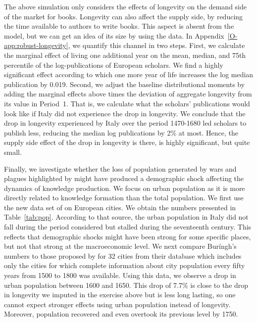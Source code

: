 The above simulation only considers the effects of longevity on the demand side of the market for books. Longevity can also affect the supply side, by reducing the time available to authors to write books. This aspect is absent from the model, but we can get an idea of its size by using the data. In Appendix~\ref{O-app:robust-longevity}, we quantify this channel  in two steps. First, we calculate the marginal effect of living one additional year on the mean, median, and 75th percentile of the log-publications of European scholars. We find a highly significant effect according to which one more year of life increases the log median publication by 0.019.
Second, we adjust the baseline distributional moments by adding the marginal effects above times the deviation of aggregate longevity from its value in Period~1.
That is, we calculate what the scholars' publications would look like if Italy did not experience the drop in longevity. We conclude that the drop in longevity experienced by Italy over the period 1470-1680 led scholars to  publish less, reducing the median log publications by 2\% at most. Hence, the supply side effect of the drop in longevity is there, is highly significant, but quite small.


Finally, we investigate whether the loss of population generated by wars and plagues highlighted by  might have produced a demographic shock affecting the dynamics of knowledge production. We focus on urban population as it is more directly related to knowledge formation than the total population.  We first use the new data set of  on European cities. We obtain the numbers presented in Table~\ref{tab:pop}. According to that source, the urban population in Italy did not fall during the period considered but stalled during the seventeenth century. This reflects that demographic shocks might have been strong for some specific places, but not that strong at the macroeconomic level. We next compare Buríngh's numbers to those proposed by  for 32 cities from their  database which includes only the cities for which complete information about city population every fifty years from 1500 to 1800 was available. Using this data, we observe a drop in urban population between 1600 and 1650. This drop of 7.7\% is close to the drop in longevity we imputed in the exercise above but is less long lasting, so one cannot expect stronger effects using urban population instead of longevity. Moreover, population recovered and even overtook its previous level by 1750.


